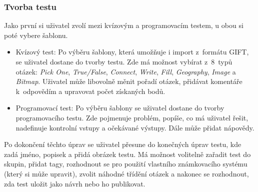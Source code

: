 \documentclass[12pt, a4paper,
openright
]{report}
\begin{document}
\subsubsection{Tvorba testu}
\label{subsec:creation}
Jako první si uživatel zvolí mezi kvízovým a programovacím testem, u obou si poté vybere šablonu.
\begin{itemize}
	\item Kvízový test: Po výběru šablony, která umožňuje i import z~formátu GIFT, se uživatel dostane do tvorby testu. Zde má možnost vybírat z~8~typů otázek: \textit{Pick One}, \textit{True/False}, \textit{Connect}, \textit{Write}, \textit{Fill}, \textit{Geography}, \textit{Image} a \textit{Bitmap}. Uživatel může libovolně měnit pořadí otázek, přidávat komentáře k~odpovědím a upravovat počet získaných bodů.
	\item Programovací test: Po výběru šablony se uživatel dostane do tvorby programovacího testu. Zde pojmenuje problém, popíše, co má uživatel řešit, nadefinuje kontrolní vstupy a očekávané výstupy. Dále může přidat nápovědy.
\end{itemize}
Po dokončení těchto úprav se uživatel přesune do konečných úprav testu, kde zadá jméno, popisek a přidá obrázek testu. Má možnost volitelně zařadit test do skupin, přidat tagy, rozhodnout se pro použití vlastního známkovacího systému (který si může upravit), zvolit náhodné třídění otázek a nakonec se rozhodnout, zda test uložit jako návrh nebo ho publikovat.
\end{document}
